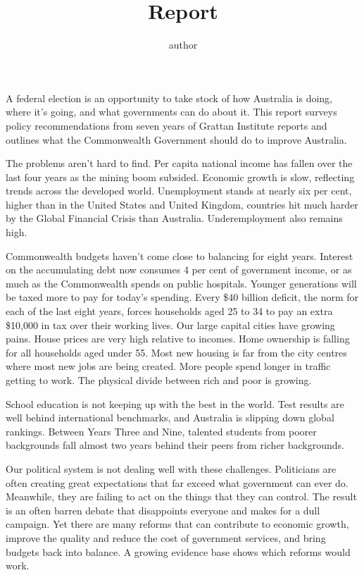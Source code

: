 \documentclass{grattanAlpha}
\title{Report}
\author{author}
\begin{document}
\contentspage

\begin{overview}[-40pt]
A federal election is an opportunity to take stock of how Australia
is doing, where it’s going, and what governments can do about it.
This report surveys policy recommendations from seven years of
Grattan Institute reports and outlines what the Commonwealth
Government should do to improve Australia.

The problems aren’t hard to find. Per capita national income has
fallen over the last four years as the mining boom subsided.
Economic growth is slow, reflecting trends across the developed
world. Unemployment stands at nearly six per cent, higher than in
the United States and United Kingdom, countries hit much harder
by the Global Financial Crisis than Australia. Underemployment
also remains high.

Commonwealth budgets haven’t come close to balancing for eight
years. Interest on the accumulating debt now consumes 4 per
cent of government income, or as much as the Commonwealth
spends on public hospitals. Younger generations will be taxed
more to pay for today’s spending. Every \$40 billion deficit, the
norm for each of the last eight years, forces households aged 25
to 34 to pay an extra \$10,000 in tax over their working lives.
Our large capital cities have growing pains. House prices are very
high relative to incomes. Home ownership is falling for all
households aged under 55. Most new housing is far from the city
centres where most new jobs are being created. More people
spend longer in traffic getting to work. The physical divide
between rich and poor is growing.

School education is not keeping up with the best in the world. Test
results are well behind international benchmarks, and Australia is
slipping down global rankings. Between Years Three and Nine,
talented students from poorer backgrounds fall almost two years
behind their peers from richer backgrounds.

Our political system is not dealing well with these challenges.
Politicians are often creating great expectations that far exceed
what government can ever do. Meanwhile, they are failing to act
on the things that they can control. The result is an often barren
debate that disappoints everyone and makes for a dull campaign.
Yet there are many reforms that can contribute to economic
growth, improve the quality and reduce the cost of government
services, and bring budgets back into balance. A growing
evidence base shows which reforms would work.


\end{overview}
\end{document}
